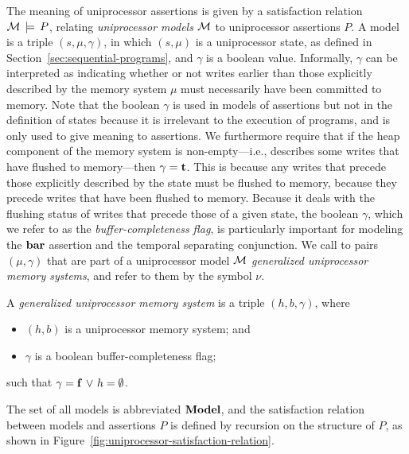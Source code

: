 \documentclass[11pt]{report}
\begin{document}
The meaning of uniprocessor assertions is given by a satisfaction relation $\mathcal{M} \,\models\, P$, relating \emph{uniprocessor models} $\mathcal{M}$ to uniprocessor assertions $P$. A model is a triple $(s,\mu,\gamma)$, in which $(s,\mu)$ is a uniprocessor state, as defined in Section~\ref{sec:sequential-programs}, and $\gamma$ is a boolean value. Informally, $\gamma$ can be interpreted as indicating whether or not writes earlier than those explicitly described by the memory system $\mu$ must necessarily have been committed to memory. Note that the boolean $\gamma$ is used in models of assertions but not in the definition of states because it is irrelevant to the execution of programs, and is only used to give meaning to assertions. We furthermore require that if the heap component of the memory system is non-empty---i.e., describes some writes that have flushed to memory---then $\gamma = \mathbf{t}$. This is because any writes that precede those explicitly described by the state must be flushed to memory, because they precede writes that have been flushed to memory. Because it deals with the flushing status of writes that precede those of a given state, the boolean $\gamma$, which we refer to as the \emph{buffer-completeness flag}, is particularly important for modeling the $\mathbf{bar}$ assertion and the temporal separating conjunction. We call to pairs $(\mu,\gamma)$ that are part of a uniprocessor model $\mathcal{M}$ \emph{generalized uniprocessor memory systems}, and refer to them by the symbol $\nu$.

\begin{definition}
  A \emph{generalized uniprocessor memory system} is a triple $(h, b, \gamma)$, where \begin{itemize}
    \item $(h,b)$ is a uniprocessor memory system; and
    \item $\gamma$ is a boolean buffer-completeness flag; 
  \end{itemize} such that $\gamma = \mathbf{f} \operatorname{\,\vee\,} h = \operatorname{\emptyset}$. 
\end{definition} 

The set of all models is abbreviated $\mathbf{Model}$, and the satisfaction relation between models and assertions $P$ is defined by recursion on the structure of $P$, as shown in Figure~\ref{fig:uniprocessor-satisfaction-relation}. 
\end{document}
